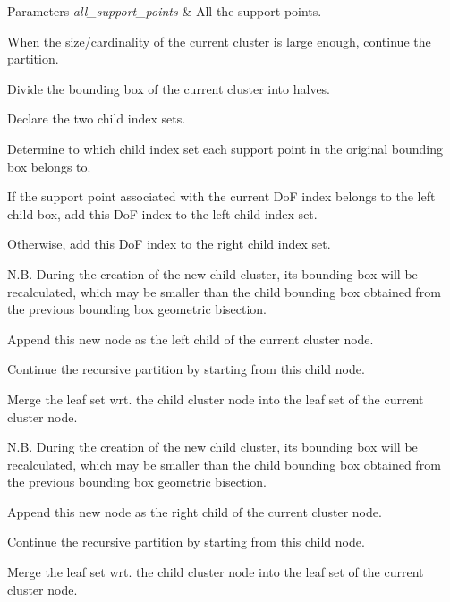 \begin{DoxyParams}{Parameters}
{\em all\+\_\+support\+\_\+points} & All the support points. \\
\hline
\end{DoxyParams}
When the size/cardinality of the current cluster is large enough, continue the partition.

Divide the bounding box of the current cluster into halves.

Declare the two child index sets.

Determine to which child index set each support point in the original bounding box belongs to.

If the support point associated with the current DoF index belongs to the left child box, add this DoF index to the left child index set.

Otherwise, add this DoF index to the right child index set.

N.\+B. During the creation of the new child cluster, its bounding box will be recalculated, which may be smaller than the child bounding box obtained from the previous bounding box geometric bisection.

Append this new node as the left child of the current cluster node.

Continue the recursive partition by starting from this child node.

Merge the leaf set wrt. the child cluster node into the leaf set of the current cluster node.

N.\+B. During the creation of the new child cluster, its bounding box will be recalculated, which may be smaller than the child bounding box obtained from the previous bounding box geometric bisection.

Append this new node as the right child of the current cluster node.

Continue the recursive partition by starting from this child node.

Merge the leaf set wrt. the child cluster node into the leaf set of the current cluster node.\mbox{\label{classClusterTree_a8b853c36834044df5283fca9e03d39d2}} 
